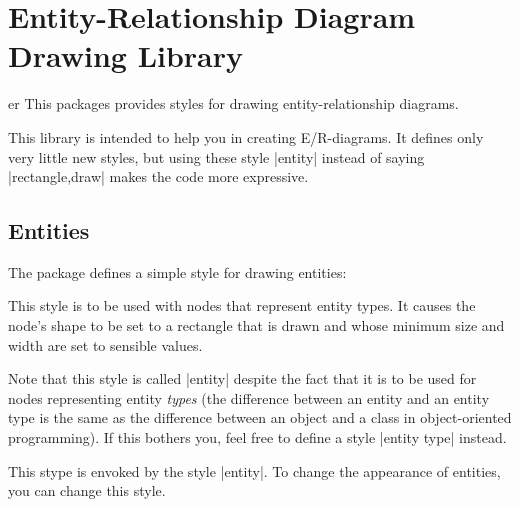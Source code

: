 %
%
%


\section{Entity-Relationship Diagram Drawing Library}

\begin{tikzlibrary}{er}
  This packages provides styles for drawing entity-relationship
  diagrams. 
\end{tikzlibrary}

This library is intended to help you in creating E/R-diagrams. It defines
only very little new styles, but using these style |entity| instead of
saying |rectangle,draw| makes the code more expressive.


\subsection{Entities}

The package defines a simple style for drawing entities:

\begin{itemize}
  This style is to be used with nodes that represent entity types. It
  causes the node's shape to be set to a rectangle that is drawn and
  whose minimum size and width are set to sensible values.

  Note that this style is called |entity| despite the fact that it is
  to be used for nodes representing entity \emph{types} (the
  difference between an entity and an entity type is the same as the
  difference between an object and a class in object-oriented
  programming). If this bothers you, feel free to define a style
  |entity type| instead.
\begin{codeexample}[]
\end{codeexample}
  
  This stype is envoked by the style |entity|. To change the
  appearance of entities, you can change this style.
\begin{codeexample}[]
\end{codeexample}
\end{itemize}



